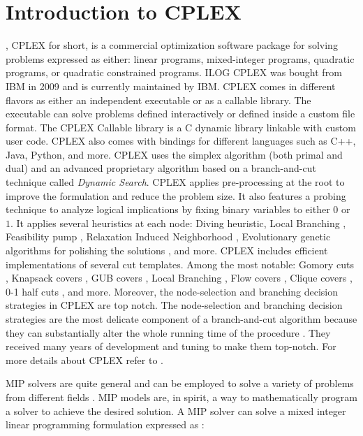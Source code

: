 \chapter{Introduction to CPLEX}
\label{sec:introduction-to-cplex}

,
CPLEX for short,
is a commercial optimization software package for solving problems expressed as either:
linear programs, mixed-integer programs, quadratic programs, or quadratic constrained programs.
ILOG CPLEX was bought from IBM in 2009 and is currently maintained by IBM.
CPLEX comes in different flavors as either an independent executable or as a callable library.
The executable can solve problems defined interactively or defined inside a custom file format.
The CPLEX Callable library is a C dynamic library linkable with custom user code.
CPLEX also comes with bindings for different languages such as C++, Java, Python, and more.
CPLEX uses the simplex algorithm (both primal and dual)
and an advanced proprietary algorithm based on a branch-and-cut technique called \textit{Dynamic Search}.
CPLEX applies pre-processing at the root to improve the formulation and reduce the problem size.
It also features a probing technique to analyze logical implications by fixing binary variables to either $0$ or $1$.
It applies several heuristics at each node: Diving heuristic, Local Branching \parencite{fischetti2003}, Feasibility pump \parencite{fischetti2005}, Relaxation Induced Neighborhood \parencite{danna2005}, Evolutionary genetic algorithms for polishing the solutions \parencite{rothberg2007}, and more.
CPLEX includes efficient implementations of several cut templates.
Among the most notable: Gomory cuts \parencite{chvatal1973}, Knapsack covers \parencite{letchford2020lifting}, GUB covers \parencite{wolsey1990valid}, Local Branching \parencite{fischetti2003}, Flow covers \parencite{padberg1985valid}, Clique covers \parencite{brigham1983clique}, 0-1 half cuts \parencite{caprara1996}, and more.
Moreover, the node-selection and branching decision strategies in CPLEX are top notch.
The node-selection and branching decision strategies
are the most delicate component of a branch-and-cut algorithm
because they can substantially alter the whole running time of the procedure \parencite{lodi2013a}.
They received many years of development and tuning to make them top-notch.
For more details about CPLEX refer to \textcite{lima2010, lodi2013}.

MIP solvers are quite general
and can be employed to solve a variety of problems from different fields \parencite{bixby2007progress}.
MIP models are, in spirit, a way to mathematically program a solver to achieve the desired solution.
A MIP solver can solve a mixed integer linear programming formulation
expressed as \parencite{wolsey1999integer}:

